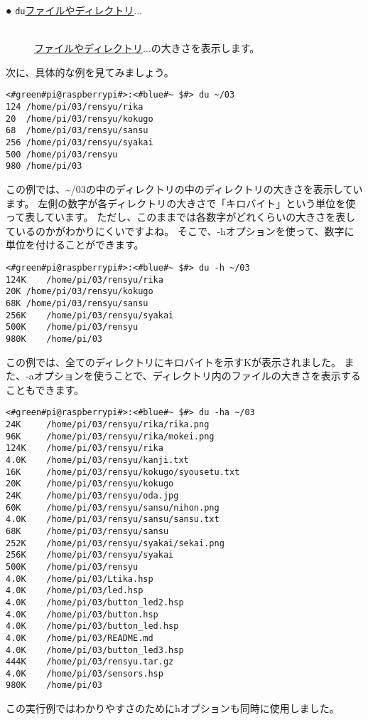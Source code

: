 \begin{description}
    \item[● \texttt{du}\textvisiblespace \underline{ファイルやディレクトリ}$\ldots$]\mbox{}\\
    \underline{ファイルやディレクトリ}$\ldots$の大きさを表示します。
\end{description}
次に、具体的な例を見てみましょう。
\begin{lstlisting}[caption=duコマンドの実行例, label=du_example]
<#green#pi@raspberrypi#>:<#blue#~ $#> du ~/03
124	/home/pi/03/rensyu/rika
20	/home/pi/03/rensyu/kokugo
68	/home/pi/03/rensyu/sansu
256	/home/pi/03/rensyu/syakai
500	/home/pi/03/rensyu
980	/home/pi/03
\end{lstlisting}
この例では、\textasciitilde/03の中のディレクトリの中のディレクトリの大きさを表示しています。
左側の数字が各ディレクトリの大きさで「キロバイト」という単位を使って表しています。
ただし、このままでは各数字がどれくらいの大きさを表しているのかがわかりにくいですよね。
そこで、-hオプションを使って、数字に単位を付けることができます。
\begin{lstlisting}[caption=du -hの実行例, label=du_example]
<#green#pi@raspberrypi#>:<#blue#~ $#> du -h ~/03
124K	/home/pi/03/rensyu/rika
20K	/home/pi/03/rensyu/kokugo
68K	/home/pi/03/rensyu/sansu
256K	/home/pi/03/rensyu/syakai
500K	/home/pi/03/rensyu
980K	/home/pi/03
\end{lstlisting}
この例では、全てのディレクトリにキロバイトを示すKが表示されました。
また、-aオプションを使うことで、ディレクトリ内のファイルの大きさを表示することもできます。
\begin{lstlisting}[caption=du -haの実行例, label=du_example]
<#green#pi@raspberrypi#>:<#blue#~ $#> du -ha ~/03
24K     /home/pi/03/rensyu/rika/rika.png
96K     /home/pi/03/rensyu/rika/mokei.png
124K	/home/pi/03/rensyu/rika
4.0K	/home/pi/03/rensyu/kanji.txt
16K     /home/pi/03/rensyu/kokugo/syousetu.txt
20K     /home/pi/03/rensyu/kokugo
24K     /home/pi/03/rensyu/oda.jpg
60K     /home/pi/03/rensyu/sansu/nihon.png
4.0K	/home/pi/03/rensyu/sansu/sansu.txt
68K     /home/pi/03/rensyu/sansu
252K	/home/pi/03/rensyu/syakai/sekai.png
256K	/home/pi/03/rensyu/syakai
500K	/home/pi/03/rensyu
4.0K	/home/pi/03/Ltika.hsp
4.0K	/home/pi/03/led.hsp
4.0K	/home/pi/03/button_led2.hsp
4.0K	/home/pi/03/button.hsp
4.0K	/home/pi/03/button_led.hsp
4.0K	/home/pi/03/README.md
4.0K	/home/pi/03/button_led3.hsp
444K	/home/pi/03/rensyu.tar.gz
4.0K	/home/pi/03/sensors.hsp
980K	/home/pi/03
\end{lstlisting}
この実行例ではわかりやすさのためにhオプションも同時に使用しました。

